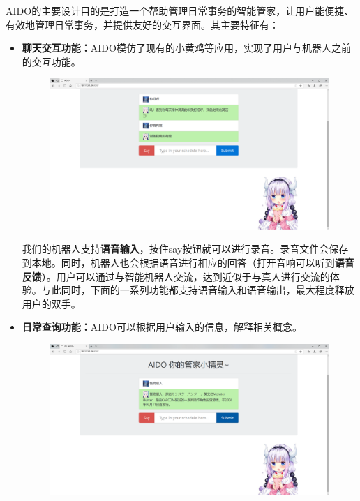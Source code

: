 \documentclass[logo,reportComp]{thesis}
\begin{document}
AIDO的主要设计目的是打造一个帮助管理日常事务的智能管家，让用户能便捷、有效地管理日常事务，并提供友好的交互界面。其主要特征有：
\begin{itemize}
\item \textbf{聊天交互功能：}AIDO模仿了现有的小黄鸡等应用，实现了用户与机器人之前的交互功能。
\begin{figure}[H]
\centering
\includegraphics[width=\linewidth]{fig/chatting}
\end{figure}

我们的机器人支持\textbf{语音输入}，按住say按钮就可以进行录音。录音文件会保存到本地。同时，机器人也会根据语音进行相应的回答（打开音响可以听到\textbf{语音反馈}）。用户可以通过与智能机器人交流，达到近似于与真人进行交流的体验。与此同时，下面的一系列功能都支持语音输入和语音输出，最大程度释放用户的双手。
\item \textbf{日常查询功能：}AIDO可以根据用户输入的信息，解释相关概念。
\begin{figure}[H]
\centering
\includegraphics[width=\linewidth]{fig/wiki}
\end{figure}


\end{itemize}
\end{document}

